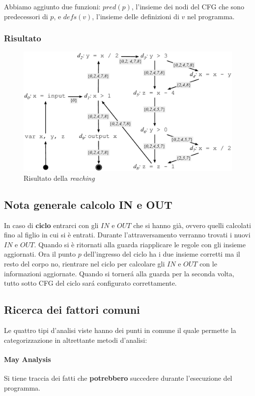 Abbiamo aggiunto due funzioni: $pred(p)$, l'insieme dei nodi del CFG che sono
predecessori di $p$, e $defs(v)$, l'insieme delle definizioni di $v$ nel
programma.

\subsubsection{Risultato}
\begin{figure}[H]
  \centering
  \includegraphics[scale=0.4]{res/image/example_reaching}
  \caption{Risultato della \textit{reaching}}
  \label{img:example_reaching}
\end{figure}

\subsection{Nota generale calcolo IN e OUT}
In caso di \textbf{ciclo} entrarci con gli $IN$ e $OUT$ che si hanno gi\`a,
ovvero quelli calcolati fino al figlio in cui si \`e entrati. Durante
l'attraversamento verranno trovati i nuovi $IN$ e $OUT$. Quando si \`e
ritornati alla guarda riapplicare le regole con gli insieme aggiornati. Ora
il punto $p$ dell'ingresso del ciclo ha i due insieme corretti ma il resto del
corpo no, rientrare nel ciclo per calcolare gli $IN$ e $OUT$ con le
informazioni aggiornate. Quando si torner\'a alla guarda per la seconda volta,
tutto sotto CFG del ciclo sar\'a configurato correttamente.

\subsection{Ricerca dei fattori comuni}
Le quattro tipi d'analisi viste hanno dei punti in comune il quale permette la
categorizzazione in altrettante metodi d'analisi:
\paragraph{May Analysis}
Si tiene traccia dei fatti che \textbf{potrebbero} succedere durante
l'esecuzione del programma.
